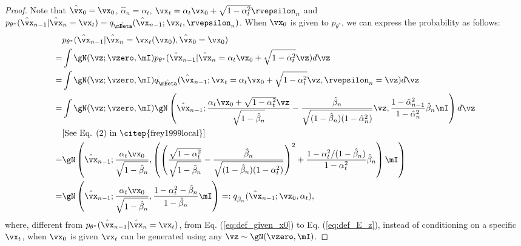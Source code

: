 \begin{proof}
Note that $\hat{\vx}_0=\vx_0$, $\hat{\alpha}_n=\alpha_t$, $\vx_t={\alpha}_{t}\vx_{0}+\sqrt{1-{\alpha}_{t}^2}\rvepsilon_{n}$ and $p_{\theta^*}(\hat{\vx}_{n-1}|\hat{\vx}_{n}=\vx_t)=q_{\hat{\mBeta}}(\hat{\vx}_{n-1};\vx_t, \rvepsilon_n)$. When $\vx_0$ is given to $p_{\theta^*}$, we can express the probability as follows:
\begin{align}
    \label{eq:def_given_x0}
    &p_{\theta^*}(\hat{\vx}_{n-1}|\hat{\vx}_{n}=\vx_t(\vx_0), \hat{\vx}_0=\vx_0)\\
    \label{eq:def_E_z}
    =
    &\int \gN(\vz;\vzero, \mI) p_{\theta^*}(\hat{\vx}_{n-1}|\hat{\vx}_{n}={\alpha}_{t}\vx_{0}+\sqrt{1-{\alpha}_{t}^2}\vz)d\vz\\
    =&\int \gN(\vz;\vzero, \mI) q_{\hat{\mBeta}}(\hat{\vx}_{n-1};\vx_t={\alpha}_{t}\vx_{0}+\sqrt{1-{\alpha}_{t}^2}\vz, \rvepsilon_{n}=\vz)d\vz\\
    =&\int \gN(\vz;\vzero, \mI)
    \gN
    \left(\hat{\vx}_{n-1};
        \frac
        {{\alpha}_{t}\vx_{0}+\sqrt{1-{\alpha}_{t}^2}\vz}{\sqrt{1-\hat{\beta}_{n}}}
        -
        \frac
        {\hat{\beta}_n}{\sqrt{(1-\hat{\beta}_n)(1-\hat{\alpha}_n^2)}}
        \vz
        ,
        \frac{1-\hat{\alpha}_{n-1}^2}{1-\hat{\alpha}_n^2}\hat{\beta}_n
        \mI
    \right) d\vz
    \\
    &\text{[See Eq. (2) in \citep{frey1999local}]}\nonumber
    \\
    =
    &\gN
    \left(\hat{\vx}_{n-1};
        \frac
        {{\alpha}_{t}\vx_{0}}{\sqrt{1-\hat{\beta}_{n}}}
        ,
        \left(
        \left(
        \frac{\sqrt{1-{\alpha}_{t}^2}}{\sqrt{1-\hat{\beta}_{n}}}
        -
        \frac
        {\hat{\beta}_n}{\sqrt{(1-\hat{\beta}_n)(1-{\alpha}_{t}^2)}}\right)^2+
        \frac{1-{\alpha}_{t}^2/(1-\hat{\beta}_n)}{1-{\alpha}_{t}^2}\hat{\beta}_n
        \right)
        \mI
    \right)\\
\label{eq:forward_rep}
    =&\gN
    \left(\hat{\vx}_{n-1};
        \frac
        {{\alpha}_{t}\vx_{0}}{\sqrt{1-\hat{\beta}_{n}}}
        ,
        \frac
        {1-\alpha_t^2-\hat{\beta}_n}
        {1-\hat{\beta}_n}
        \mI
    \right)=:q_{\hat{\beta}_n}(\hat{\vx}_{n-1};\vx_{0},{\alpha}_{t}),
\end{align}
where, different from $p_{\theta^*}(\hat{\vx}_{n-1}|\hat{\vx}_{n}=\vx_t)$, from Eq. (\ref{eq:def_given_x0}) to Eq. (\ref{eq:def_E_z}), instead of conditioning on a specific $\vx_{t}$, when $\vx_0$ is given $\vx_t$ can be generated using any $\vz\sim\gN(\vzero, \mI)$.


\end{proof}
